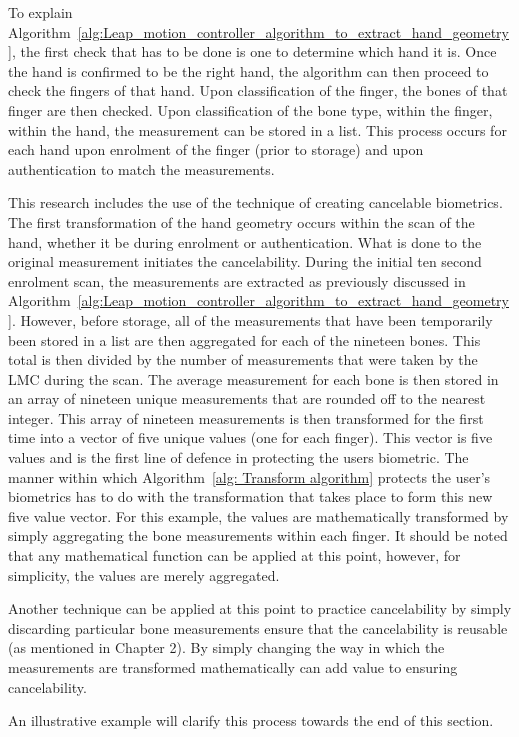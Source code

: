 To explain Algorithm~\ref{alg:Leap_motion_controller_algorithm_to_extract_hand_geometry}, the first check that has to be done is one to determine which hand it is. Once the hand is confirmed to be the right hand, the algorithm can then proceed to check the fingers of that hand. Upon classification of the finger, the bones of that finger are then checked. Upon classification of the bone type, within the finger, within the hand, the measurement can be stored in a list. This process occurs for each hand upon enrolment of the finger (prior to storage) and upon authentication to match the measurements.

This research includes the use of the technique of creating cancelable biometrics. The first transformation of the hand geometry occurs within the scan of the hand, whether it be during enrolment or authentication. What is done to the original measurement initiates the cancelability. During the initial ten second enrolment scan, the measurements are extracted as previously discussed in Algorithm~\ref{alg:Leap_motion_controller_algorithm_to_extract_hand_geometry}. However, before storage, all of the measurements that have been temporarily been stored in a list are then aggregated for each of the nineteen bones. This total is then divided by the number of measurements that were taken by the LMC during the scan. The average measurement for each bone is then stored in an array of nineteen unique measurements that are rounded off to the nearest integer. This array of nineteen measurements is then transformed for the first time into a vector of five unique values (one for each finger). This vector is five values and is the first line of defence in protecting the users biometric. The manner within which Algorithm~\ref{alg: Transform algorithm} protects the user's biometrics has to do with the transformation that takes place to form this new five value vector. For this example, the values are mathematically transformed by simply aggregating the bone measurements within each finger. It should be noted that any mathematical function can be applied at this point, however, for simplicity, the values are merely aggregated. 

Another technique can be applied at this point to practice cancelability by simply discarding particular bone measurements ensure that the cancelability is reusable (as mentioned in Chapter 2). By simply changing the way in which the measurements are transformed mathematically can add value to ensuring cancelability. 

An illustrative example will clarify this process towards the end of this section.

